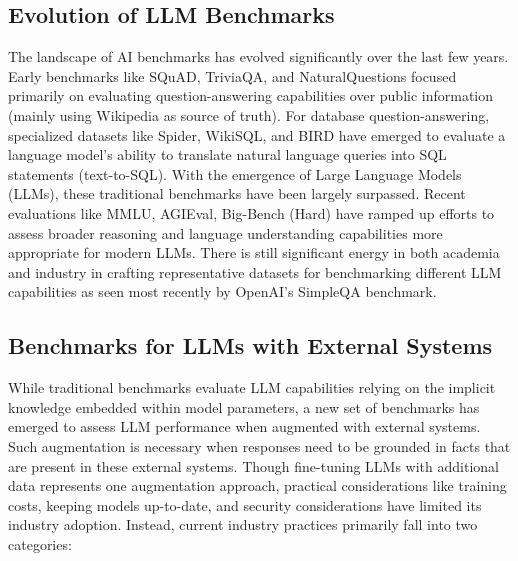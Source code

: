 \documentclass[11pt,a4paper]{article}
\begin{document}
\subsection{Evolution of LLM Benchmarks}
The landscape of AI benchmarks has evolved significantly over the last few years. Early benchmarks like SQuAD\cite{squad}, TriviaQA\cite{triviaqa}, and NaturalQuestions\cite{naturalq} focused primarily on evaluating question-answering capabilities over public information (mainly using Wikipedia as source of truth). For database question-answering, specialized datasets like Spider\cite{spider}, WikiSQL\cite{wikisql}, and BIRD\cite{bird} have emerged to evaluate a language model's ability to translate natural language queries into SQL statements (text-to-SQL). With the emergence of Large Language Models (LLMs), these traditional benchmarks have been largely surpassed. Recent evaluations like MMLU\cite{mmlu}, AGIEval\cite{agieval2023}, Big-Bench (Hard)\cite{bigbench,bigbench-hard} have ramped up efforts to assess broader reasoning and language understanding capabilities more appropriate for modern LLMs. There is still significant energy in both academia and industry in crafting representative datasets for benchmarking different LLM capabilities as seen most recently by OpenAI's SimpleQA\cite{simpleqa} benchmark.

\subsection{Benchmarks for LLMs with External Systems}
While traditional benchmarks evaluate LLM capabilities relying on the implicit knowledge embedded within model parameters, a new set of benchmarks has emerged to assess LLM performance when augmented with external systems. Such augmentation is necessary when responses need to be grounded\cite{grounding} in facts that are present in these external systems. Though fine-tuning LLMs\cite{fine-tuning} with additional data represents one augmentation approach, practical considerations like training costs, keeping models up-to-date, and security considerations have limited its industry adoption. Instead, current industry practices primarily fall into two categories:
\end{document}
